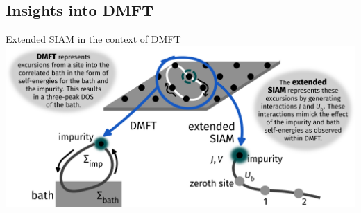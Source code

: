 \documentclass[9pt,aspectratio=169]{beamer}
\begin{document}
\begin{frame}{}
\section{Insights into DMFT}
\end{frame}

\begin{frame}{Extended SIAM in the context of DMFT}
\centering
\hspace*{-20pt}\includegraphics[width=1.1\textwidth]{contrast.pdf}
	
\end{frame}
\end{document}
